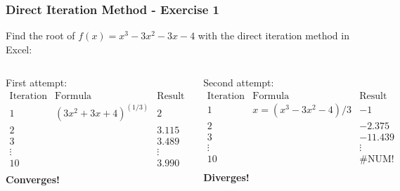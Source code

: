 \begin{frame}[fragile]
  \frametitle{Direct Iteration Method - Exercise 1}

  Find the root of \(f(x) = x^3 -3x^2 - 3x - 4\) with the direct iteration method in Excel:
  \vspace{0.5cm}
  \begin{columns}
    First attempt:\newline
    \vspace{0.2cm}
    \(
    \begin{array}{c|c|c}
      \text{Iteration} & \text{Formula}          & \text{Result} \\
      \hline
      1                & (3x^2 + 3x + 4)^{(1/3)} & 2             \\
      2                &                         & 3.115         \\
      3                &                         & 3.489         \\
      \vdots           &                         & \vdots        \\
      10               &                         & 3.990         \\
    \end{array}
    \)
    \newline
    \newline
    \vspace{0.2cm}
    \textbf{Converges!}

    Second attempt:\newline
    \vspace{0.2cm}
    \(
    \begin{array}{c|c|c}
      \text{Iteration} & \text{Formula}         & \text{Result} \\
      \hline
      1                & x = (x^3 - 3x^2 - 4)/3 & -1            \\
      2                &                        & -2.375        \\
      3                &                        & -11.439       \\
      \vdots           &                        & \vdots        \\
      10               &                        & \text{\#NUM!} \\
    \end{array}
    \)
    \newline
    \newline
    \vspace{0.2cm}
    \textbf{Diverges!}
  \end{columns}
\end{frame}

